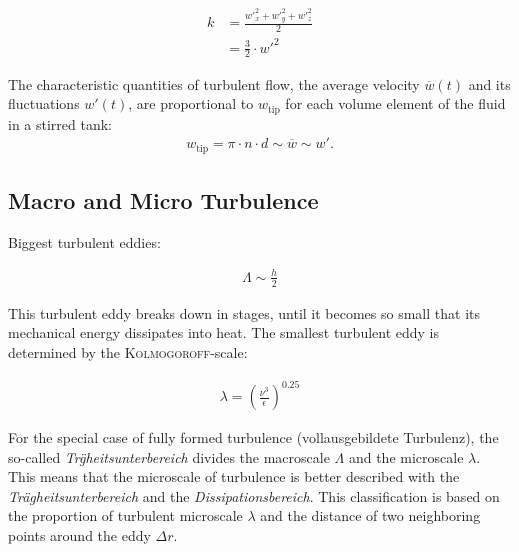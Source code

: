 \begin{align}
        k   &= \frac{{w'}_x^2 + {w'}_y^2 + {w'}_z^2}{2} \nonumber \\
            &= \frac{3}{2} \cdot {w'}^2
\end{align}

The characteristic quantities of turbulent flow, the average velocity $\overline{w}(t)$ and its fluctuations $w'(t)$, are proportional to $w_{\text{tip}}$ for each volume element of the fluid in a stirred tank:
\begin{gather}
    w_\text{tip} = \pi{} \cdot n \cdot d \sim \overline{w} \sim w'.
\end{gather}


\subsection{Macro and Micro Turbulence}

Biggest turbulent eddies: \citep{Wollny2010Diss}

\begin{align}
    \Lambda \sim \frac{h}{2} %
\end{align}

This turbulent eddy breaks down in stages, until it becomes so small that its mechanical energy dissipates into heat. The smallest turbulent eddy is determined by the \textsc{Kolmogoroff}-scale:

\begin{align}
	\lambda = \left( \frac{\nu^3}{\epsilon} \right)^{0.25}
\end{align}

For the special case of fully formed turbulence (vollausgebildete Turbulenz), the so-called \textit{Tr\"gheitsunterbereich} divides the macroscale $\Lambda$ and the microscale $\lambda$. This means that the microscale of turbulence is better described with the \textit{Tr\"agheitsunterbereich} and the \textit{Dissipationsbereich}. This classification is based on the proportion of turbulent microscale $\lambda$ and the distance of two neighboring points around the eddy $\Delta{}r$. 

